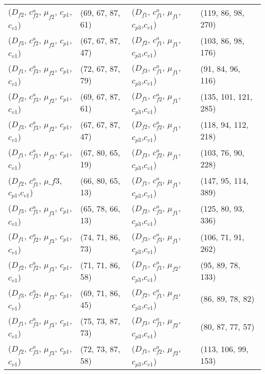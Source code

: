 \documentclass[preprint,12pt]{elsarticle}
\begin{document}
\begin{appendices}
\begin{table}[htbp]
\begin{tabular}{llll}
    ($D_{f2}$, $c^{a}_{f2}$, $\mu_{f2}$, $c_{p1}$, $c_{v1}$) & (69, 67, 87, 61) & ($D_{f1}$, $c^{a}_{f1}$, $\mu_{f1}$, $c_{p3}$,$c_{v1}$) & (119, 86, 98, 270) \\
    ($D_{f3}$, $c^{a}_{f2}$, $\mu_{f2}$, $c_{p1}$, $c_{v1}$) & (67, 67, 87, 47) & ($D_{f2}$, $c^{a}_{f1}$, $\mu_{f1}$, $c_{p3}$,$c_{v1}$) & (103, 86, 98, 176) \\
     ($D_{f1}$, $c^{a}_{f3}$, $\mu_{f2}$, $c_{p1}$, $c_{v1}$) & (72, 67, 87, 79) & ($D_{f3}$, $c^{a}_{f1}$, $\mu_{f1}$, $c_{p3}$,$c_{v1}$) & (91, 84, 96, 116) \\
     ($D_{f2}$, $c^{a}_{f3}$, $\mu_{f2}$, $c_{p1}$, $c_{v1}$) & (69, 67, 87, 61) & ($D_{f1}$, $c^{a}_{f2}$, $\mu_{f1}$, $c_{p3}$,$c_{v1}$) & (135, 101, 121, 285) \\
     ($D_{f3}$, $c^{a}_{f3}$, $\mu_{f2}$, $c_{p1}$, $c_{v1}$) & (67, 67, 87, 47) & ($D_{f2}$, $c^{a}_{f2}$, $\mu_{f1}$, $c_{p3}$,$c_{v1}$) & (118, 94, 112, 218) \\
    ($D_{f1}$, $c^{a}_{f1}$, $\mu_{f3}$, $c_{p1}$,$c_{v1}$) & (67, 80, 65, 19) & ($D_{f3}$, $c^{a}_{f2}$, $\mu_{f1}$, $c_{p3}$,$c_{v1}$) & (103, 76, 90, 228) \\
    ($D_{f2}$, $c^{a}_{f1}$, $\mu\_{f3}$, $c_{p1}$,$c_{v1}$) & (66, 80, 65, 13) & ($D_{f1}$, $c^{a}_{f3}$, $\mu_{f1}$, $c_{p3}$,$c_{v1}$) & (147, 95, 114, 389) \\
    ($D_{f3}$, $c^{a}_{f1}$, $\mu_{f3}$, $c_{p1}$,$c_{v1}$) & (65, 78, 66, 13) & ($D_{f2}$, $c^{a}_{f3}$, $\mu_{f1}$, $c_{p3}$,$c_{v1}$) & (125, 80, 93, 336) \\
    ($D_{f1}$, $c^{a}_{f2}$, $\mu_{f3}$, $c_{p1}$,$c_{v1}$) & (74, 71, 86, 73) & ($D_{f3}$, $c^{a}_{f3}$, $\mu_{f1}$, $c_{p3}$,$c_{v1}$) & (106, 71, 91, 262) \\
    ($D_{f2}$, $c^{a}_{f2}$, $\mu_{f3}$, $c_{p1}$, $c_{v1}$) & (71, 71, 86, 58) & ($D_{f1}$, $c^{a}_{f1}$, $\mu_{f2}$, $c_{p3}$,$c_{v1}$) & (95, 89, 78, 133) \\
    ($D_{f3}$, $c^{a}_{f2}$, $\mu_{f3}$, $c_{p1}$,$c_{v1}$) & (69, 71, 86, 45) & ($D_{f2}$, $c^{a}_{f1}$, $\mu_{f2}$, $c_{p3}$,$c_{v1}$) & (86, 89, 78, 82) \\
    ($D_{f1}$, $c^{a}_{f3}$, $\mu_{f3}$, $c_{p1}$,$c_{v1}$) & (75, 73, 87, 73) & ($D_{f3}$, $c^{a}_{f1}$, $\mu_{f2}$, $c_{p3}$,$c_{v1}$) & (80, 87, 77, 57) \\
    ($D_{f2}$, $c^{a}_{f3}$, $\mu_{f3}$, $c_{p1}$,$c_{v1}$) & (72, 73, 87, 58) & ($D_{f1}$, $c^{a}_{f2}$, $\mu_{f2}$, $c_{p3}$,$c_{v1}$) & (113, 106, 99, 153) \\

\end{tabular}
\end{table}
\end{appendices}
\end{document}
